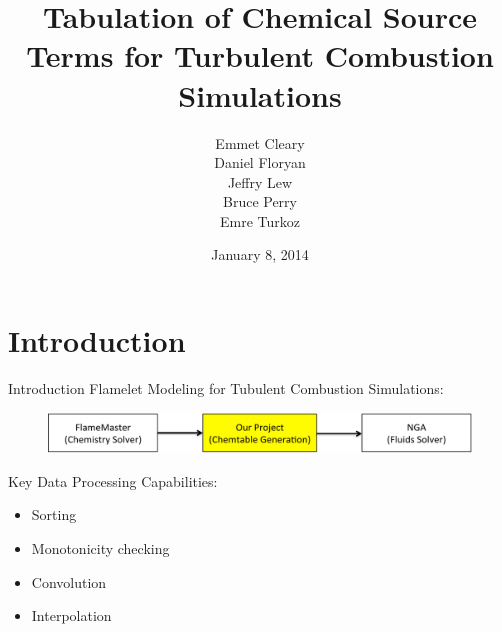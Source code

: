 \documentclass{beamer}
\title[APC 524 Design Review]{Tabulation of Chemical Source Terms for Turbulent Combustion Simulations}
\author{Emmet Cleary \\
Daniel Floryan \\
Jeffry Lew \\
Bruce Perry \\
Emre Turkoz}
\date{January 8, 2014}
\begin{document}
\begin{frame}
  \titlepage
\end{frame}


\section{Introduction}
\begin{frame}{Introduction}
Flamelet Modeling for Tubulent Combustion Simulations:
\begin{figure}
\includegraphics[width=\textwidth]{scope.pdf}
\end{figure}
Key Data Processing Capabilities:
\begin{itemize}
\item Sorting
\item Monotonicity checking
\item Convolution
\item Interpolation
\end{itemize}
\vspace{12pt}
\end{frame}
\end{document}
